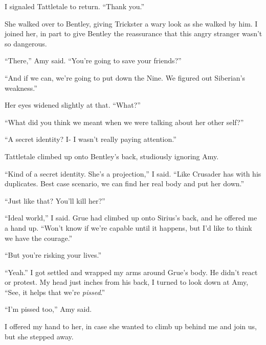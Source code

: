 I signaled Tattletale to return.  ``Thank you.''



She walked over to Bentley, giving Trickster a wary look as she walked by him.  I joined her, in part to give Bentley the reassurance that this angry stranger wasn't so dangerous.



``There,'' Amy said.  ``You're going to save your friends?''



``And if we can, we're going to put down the Nine.  We figured out Siberian's weakness.''



Her eyes widened slightly at that.  ``What?''



``What did you think we meant when we were talking about her other self?''



``A secret identity?  I- I wasn't really paying attention.''



Tattletale climbed up onto Bentley's back, studiously ignoring Amy.



``Kind of a secret identity.  She's a projection,'' I said.  ``Like Crusader has with his duplicates.  Best case scenario, we can find her real body and put her down.''



``Just like that?  You'll kill her?''



``Ideal world,'' I said.  Grue had climbed up onto Sirius's back, and he offered me a hand up.  ``Won't know if we're capable until it happens, but I'd like to think we have the courage.''



``But you're risking your lives.''



``Yeah.''  I got settled and wrapped my arms around Grue's body.  He didn't react or protest.  My head just inches from his back, I turned to look down at Amy, ``See, it helps that we're \emph{pissed}.''



``I'm pissed too,'' Amy said.



I offered my hand to her, in case she wanted to climb up behind me and join us, but she stepped away.




